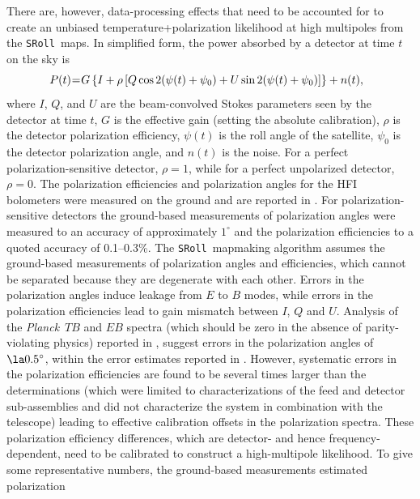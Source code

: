\documentclass[longauth,traditabstract]{aa}
\def\Planck{\textit{Planck}}
\def\,{\thinspace}
\newcommand{\sroll}{\texttt{SRoll}}
\begin{document}
There are, however, data-processing effects that need to be accounted
for to create an unbiased temperature+polarization likelihood at high multipoles
from the \sroll\ maps. In simplified form, the power absorbed by a detector at time $t$ on the sky is
\begin{equation}
P(t) \hspace{-0.8mm} = \hspace{-0.8mm} G\left\{I + \rho\left[ Q\cos 2(\psi(t) + \psi_0)+U \sin 2(\psi(t) + \psi_0) \right] \right\} + n(t), \ \ \label{bol}
\end{equation}
where $I$, $Q$, and $U$ are the beam-convolved Stokes parameters seen by
the detector at time $t$, $G$ is the effective gain (setting the
absolute calibration), $\rho$ is the detector polarization efficiency,
$\psi(t)$ is the roll angle of the satellite, $\psi_0$ is the detector
polarization angle, and $n(t)$ is the noise. For a perfect
polarization-sensitive detector, $\rho=1$, while for a perfect
unpolarized detector, $\rho = 0$. The polarization efficiencies and
polarization angles for the HFI bolometers were measured on the ground
and are reported in \cite{rosset2010}. For polarization-sensitive
detectors the ground-based measurements of polarization angles were
measured to an accuracy of approximately $1^\circ$ and the polarization
efficiencies to a quoted accuracy of 0.1--0.3\,\%. The \sroll\
mapmaking algorithm assumes the ground-based measurements of
polarization angles and efficiencies, which cannot be separated
because they are degenerate with each other.  Errors in the
polarization angles induce leakage from $E$ to $B$ modes, while errors
in the polarization efficiencies lead to gain mismatch between $I$, $Q$ and $U$.
 Analysis of the \Planck\ $TB$ and $EB$ spectra (which should
be zero in the absence of parity-violating physics) reported
in \citet{planck2016-l03}, suggest errors in the polarization angles of
$\la0.5^\circ$, within the error estimates reported in \cite{rosset2010}.
However, systematic errors in the polarization efficiencies are found to be
several times larger than the \cite{rosset2010} determinations
(which were limited to characterizations of the feed and detector sub-assemblies
and did not characterize the system in combination with the telescope)
leading to effective calibration offsets in the
polarization spectra. These polarization efficiency differences, which are
detector- and hence frequency-dependent, need to be calibrated to
construct a high-multipole likelihood. To give some representative numbers,
the \citet{rosset2010} ground-based measurements estimated polarization
\end{document}
